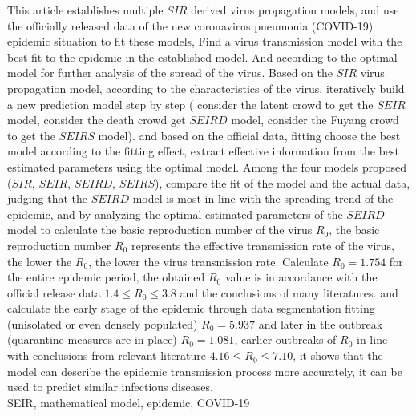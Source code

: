 \begin{enabstract}
	This article establishes multiple $ SIR $ derived virus propagation models,
	and use the officially released data of the new coronavirus pneumonia (COVID-19) epidemic situation to fit these models,
	Find a virus transmission model with the best fit to the epidemic in the established model.
	And according to the optimal model for further analysis of the spread of the virus.
	Based on the $ SIR $ virus propagation model,
	according to the characteristics of the virus, iteratively build a new prediction model step by step (
	consider the latent crowd to get the $ SEIR $ model,
	consider the death crowd get $ SEIRD $ model,
	consider the Fuyang crowd to get the $ SEIRS $ model).
	and based on the official data, fitting
	choose the best model according to the fitting effect,
	extract effective information from the best estimated parameters using the optimal model.
	Among the four models proposed ($ SIR $, $ SEIR $, $ SEIRD $, $ SEIRS $),
	compare the fit of the model and the actual data,
	judging that the $ SEIRD $ model is most in line with the spreading trend of the epidemic,
	and by analyzing the optimal estimated parameters of the $ SEIRD $ model to calculate the basic reproduction number of the virus $ R_0 $,
	the basic reproduction number $ R_0 $ represents the effective transmission rate of the virus,
	the lower the $ R_0 $, the lower the virus transmission rate.
	Calculate $ R_0 = 1.754 $ for the entire epidemic period,
	the obtained $ R_0 $ value is in accordance with the official release data $ 1.4 \leq R_0 \leq 3.8 $ and the conclusions of many literatures.
	and calculate the early stage of the epidemic through data segmentation fitting (unisolated or even densely populated) $ R_0 = 5.937 $
	and later in the outbreak (quarantine measures are in place) $ R_0 = 1.081 $,
	earlier outbreaks of $ R_0 $ in line with conclusions from relevant literature $ 4.16 \leq R_0 \leq 7.10 $,
	it shows that the model can describe the epidemic transmission process more accurately,
	it can be used to predict similar infectious diseases.
	\\
	 SEIR, mathematical model, epidemic, COVID-19
\end{enabstract}